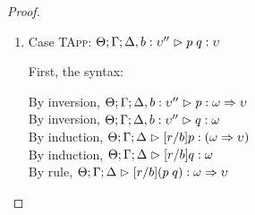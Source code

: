 \begin{proof}
\begin{enumerate}
  First, the syntax:
  \begin{tabbedproof}
    \oo By inversion, $\judgeA[\Theta, \beta:\kappa'; \Gamma; \Delta, b:\upsilon'']{p}{\upsilon}$ \\
    \oo By induction, $\judgeA[\Theta, \beta:\kappa'; \Gamma; \Delta]{[r/b]p}{\upsilon}$ \\
    \oo By rule, $\judgeA{\pfunall{\beta}{\kappa'}{[r/b]p}}{\forallsort{\beta}{\kappa'}{\upsilon}}$ \\
    \oo By def of subst, $\judgeA{[r/b](\pfunall{\beta}{\kappa'}{p})}{\forallsort{\beta}{\kappa'}{\upsilon}}$ \\
  \end{tabbedproof}
  For semantics, consider $\interp{\judgeA{[r/b](\pfun{\beta}{\kappa'}{p})}{\forallsort{\beta}{\kappa'}{\upsilon}}}\;\theta\;\gamma\;\delta$ \\
  \begin{eqnproof}
          {Semantics}
          {Induction}
          {Semantics}
  \end{eqnproof}
  This case relies upon the fact that $\Gamma$ and $\Delta$ do not have $\beta$ free and the 
  equality of sorts under substitution. 



\item Case \textsc{TApp}: $\judgeA[\Theta; \Gamma; \Delta, b:\upsilon'']{p\;q}{\upsilon}$
  
  First, the syntax:
  \begin{tabbedproof}
    \oo By inversion, $\judgeA[\Theta; \Gamma; \Delta, b:\upsilon'']{p}{\omega \To \upsilon}$\\
    \oo By inversion, $\judgeA[\Theta; \Gamma; \Delta, b:\upsilon'']{q}{\omega}$\\
    \oo By induction, $\judgeA[\Theta; \Gamma; \Delta]{[r/b]p}{(\omega \To \upsilon)}$\\
    \oo By induction, $\judgeA[\Theta; \Gamma; \Delta]{[r/b]q}{\omega}$\\
    \oo By rule, $\judgeA[\Theta; \Gamma; \Delta]{[r/b](p\;q)}{\omega \To \upsilon}$\\
  \end{tabbedproof}


\end{enumerate}
\end{proof}
